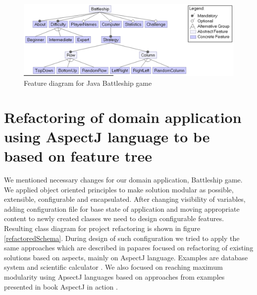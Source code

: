 \documentclass[11pt,english,a4paper,twoside]{article}
\begin{document}
\begin{figure}[H]  %
					\begin{center}
									\includegraphics[width=\linewidth]{fig/battleshipFeatureModel.png}
									\caption{Feature diagram for Java Battleship game}
									\label{battleshipFeatureModel}
					\end{center}
\end{figure}


\section{Refactoring of domain application using AspectJ language to be based on feature tree} \label{gameRefactoring}

We mentioned necessary changes for our domain application, Battleship game. We applied object oriented principles to make solution modular as possible, extensible, configurable and encapsulated. After changing visibility of variables, adding configuration file for base state of application and moving appropriate content to newly created classes we need to design configurable features. Resulting class diagram for project refactoring is shown in figure \ref{refactoredSchema}. During design of such configuration we tried to apply the same approaches which are described in papares focused on refactoring of existing solutions based on aspects, mainly on AspectJ language. Examples are database system \cite{kastner_case_2007} and scientific calculator \cite{botterweck_automating_2009}. We also focused on reaching maximum modularity using ApsectJ languages based on approaches from examples presented in book AspectJ in action \cite{laddad_aspectj_2003}.
\end{document}
